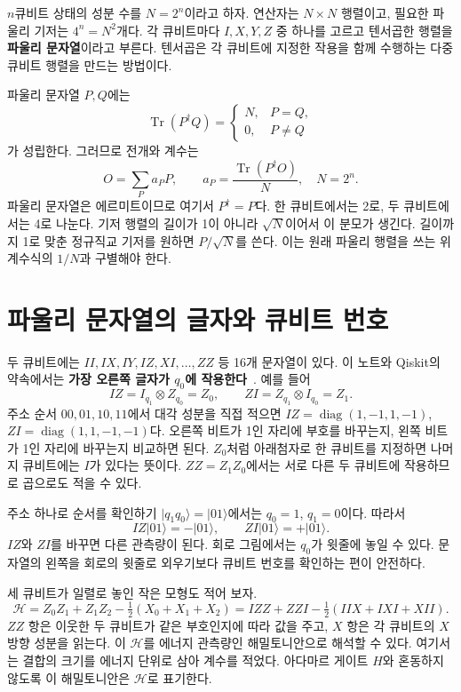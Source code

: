\(n\)큐비트 상태의 성분 수를 \(N=2^n\)이라고 하자.
연산자는 \(N\times N\) 행렬이고, 필요한 파울리 기저는 \(4^n=N^2\)개다.
각 큐비트마다 \(I,X,Y,Z\) 중 하나를 고르고 텐서곱한 행렬을
\textbf{파울리 문자열}이라고 부른다. 텐서곱은 각 큐비트에 지정한 작용을
함께 수행하는 다중 큐비트 행렬을 만드는 방법이다.

파울리 문자열 \(P,Q\)에는
\[
\operatorname{Tr}(P^\dagger Q)=
\begin{cases}N,&P=Q,\\0,&P\ne Q\end{cases}
\]
가 성립한다. 그러므로 전개와 계수는
\[
\boxed{\quad O=\sum_P a_PP,\qquad
a_P=\frac{\operatorname{Tr}(P^\dagger O)}{N},\quad N=2^n.\quad}
\]
파울리 문자열은 에르미트이므로 여기서 \(P^\dagger=P\)다.
한 큐비트에서는 2로, 두 큐비트에서는 4로 나눈다.
기저 행렬의 길이가 1이 아니라 \(\sqrt N\)이어서 이 분모가 생긴다.
길이까지 1로 맞춘 정규직교 기저를 원하면 \(P/\sqrt N\)를 쓴다.
이는 원래 파울리 행렬을 쓰는 위 계수식의 \(1/N\)과 구별해야 한다.

\section{파울리 문자열의 글자와 큐비트 번호}

두 큐비트에는 \(II,IX,IY,IZ,XI,\ldots,ZZ\) 등 16개 문자열이 있다.
이 노트와 Qiskit의 약속에서는 \textbf{가장 오른쪽 글자가 \(q_0\)에 작용한다}~\cite{ibm-order}.
예를 들어
\[
IZ=I_{q_1}\otimes Z_{q_0}=Z_0,\qquad
ZI=Z_{q_1}\otimes I_{q_0}=Z_1.
\]
주소 순서 \(00,01,10,11\)에서 대각 성분을 직접 적으면
\(IZ=\operatorname{diag}(1,-1,1,-1)\),
\(ZI=\operatorname{diag}(1,1,-1,-1)\)다.
오른쪽 비트가 1인 자리에 부호를 바꾸는지, 왼쪽 비트가 1인 자리에 바꾸는지 비교하면 된다.
\(Z_0\)처럼 아래첨자로 한 큐비트를 지정하면 나머지 큐비트에는 \(I\)가 있다는 뜻이다.
\(ZZ=Z_1Z_0\)에서는 서로 다른 두 큐비트에 작용하므로 곱으로도 적을 수 있다.

\begin{examplebox}{주소 하나로 순서를 확인하기}
\(\lvert q_1q_0\rangle=\lvert01\rangle\)에서는 \(q_0=1\), \(q_1=0\)이다.
따라서
\[
IZ\lvert01\rangle=-\lvert01\rangle,\qquad
ZI\lvert01\rangle=+\lvert01\rangle.
\]
\(IZ\)와 \(ZI\)를 바꾸면 다른 관측량이 된다.
회로 그림에서는 \(q_0\)가 윗줄에 놓일 수 있다. 문자열의 왼쪽을 회로의 윗줄로
외우기보다 큐비트 번호를 확인하는 편이 안전하다.
\end{examplebox}

세 큐비트가 일렬로 놓인 작은 모형도 적어 보자.
\[
\mathcal H=Z_0Z_1+Z_1Z_2-\tfrac12(X_0+X_1+X_2)
=IZZ+ZZI-\tfrac12(IIX+IXI+XII).
\]
\(ZZ\) 항은 이웃한 두 큐비트가 같은 부호인지에 따라 값을 주고,
\(X\) 항은 각 큐비트의 \(X\) 방향 성분을 읽는다.
이 \(\mathcal H\)를 에너지 관측량인 해밀토니안으로 해석할 수 있다.
여기서는 결합의 크기를 에너지 단위로 삼아 계수를 적었다.
아다마르 게이트 \(H\)와 혼동하지 않도록 이 해밀토니안은 \(\mathcal H\)로 표기한다.


